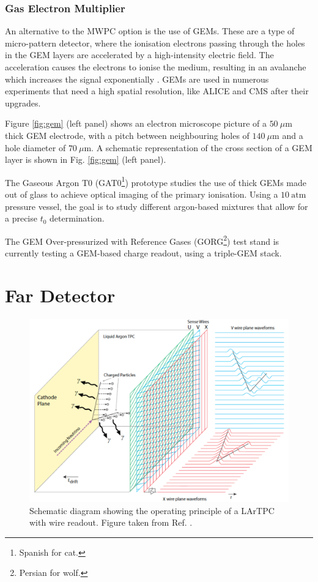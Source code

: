 \subsubsection{Gas Electron Multiplier}

An alternative to the MWPC option is the use of GEMs. These are a type of micro-pattern detector, where the ionisation electrons passing through the holes in the GEM layers are accelerated by a high-intensity electric field. The acceleration causes the electrons to ionise the medium, resulting in an avalanche which increases the signal exponentially \cite{Sauli1997}. GEMs are used in numerous experiments that need a high spatial resolution, like ALICE \cite{Lippmann2016} and CMS \cite{Calabria2016} after their upgrades.

Figure \ref{fig:gem} (left panel) shows an electron microscope picture of a $50~\mu\mathrm{m}$ thick GEM electrode, with a pitch between neighbouring holes of $140~\mu\mathrm{m}$ and a hole diameter of $70~\mu\mathrm{m}$. A schematic representation of the cross section of a GEM layer is shown in Fig. \ref{fig:gem} (left panel).

The Gaseous Argon T0 (GAT0\footnote{Spanish for cat.}) prototype studies the use of thick GEMs made out of glass to achieve optical imaging of the primary ionisation. Using a $10~\mathrm{atm}$ pressure vessel, the goal is to study different argon-based mixtures that allow for a precise $t_{0}$ determination.

The GEM Over-pressurized with Reference Gases (GORG\footnote{Persian for wolf.}) test stand is currently testing a GEM-based charge readout, using a triple-GEM stack.

\section{Far Detector}

\begin{figure}[t]
	\centering
	\includegraphics[width=0.8\linewidth]{Images/DUNE/FD/tpc}
	\caption[Schematic diagram showing the operating principle of a LArTPC with wire readout.]{Schematic diagram showing the operating principle of a LArTPC with wire readout. Figure taken from Ref. \cite{DUNE2020TDR1}.}
	\label{fig:lartpc}
\end{figure}


